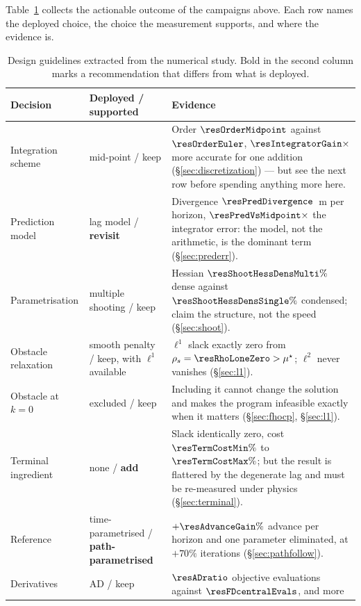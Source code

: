 \documentclass[11pt,a4paper]{article}
\begin{document}
Table~\ref{tab:guidelines} collects the actionable outcome of the campaigns above. Each row names the
deployed choice, the choice the measurement supports, and where the evidence is.

\begin{table}[htbp]
  \centering
  \small
  \caption{Design guidelines extracted from the numerical study. Bold in the second column marks a
  recommendation that differs from what is deployed.}
  \label{tab:guidelines}
  \begin{tabular}{p{}p{}p{}}
    \toprule
    Decision & Deployed / supported & Evidence \\
    \midrule
    Integration scheme & mid-point / keep & Order $\resOrderMidpoint$ against $\resOrderEuler$,
      $\resIntegratorGain\times$ more accurate for one addition (\S\ref{sec:discretization}) --- but see the
      next row before spending anything more here. \\
    Prediction model & lag model / \textbf{revisit} & Divergence $\resPredDivergence$~m per horizon,
      $\resPredVsMidpoint\times$ the integrator error: the model, not the arithmetic, is the dominant term
      (\S\ref{sec:prederr}). \\
    Parametrisation & multiple shooting / keep & Hessian $\resShootHessDensMulti\%$ dense against
      $\resShootHessDensSingle\%$ condensed; claim the structure, not the speed (\S\ref{sec:shoot}). \\
    Obstacle relaxation & smooth penalty / keep, with $\ell^1$ available & $\ell^1$ slack exactly zero from
      $\rho_s=\resRhoLoneZero>\mu^\star$; $\ell^2$ never vanishes (\S\ref{sec:l1}). \\
    Obstacle at $k=0$ & excluded / keep & Including it cannot change the solution and makes the program
      infeasible exactly when it matters (\S\ref{sec:fhocp}, \S\ref{sec:l1}). \\
    Terminal ingredient & none / \textbf{add} & Slack identically zero, cost $\resTermCostMin\%$ to
      $\resTermCostMax\%$; but the result is flattered by the degenerate lag and must be re-measured under
      physics (\S\ref{sec:terminal}). \\
    Reference & time-parametrised / \textbf{path-parametrised} & $+\resAdvanceGain\%$ advance per horizon and
      one parameter eliminated, at $+70\%$ iterations (\S\ref{sec:pathfollow}). \\
    Derivatives & AD / keep & $\resADratio$ objective evaluations against $\resFDcentralEvals$, and more

\end{tabular}
\end{table}
\end{document}
